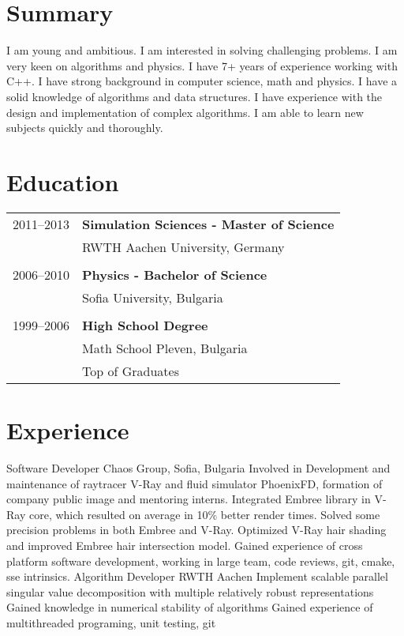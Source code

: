 \section*{Summary} 
I am young and ambitious. I am interested in solving challenging
problems. I am very keen on algorithms and physics. I have 7+ years of
experience working with C++. I have strong background in computer
science, math and physics. I have a solid knowledge of algorithms and
data structures. I have experience with the design and implementation
of complex algorithms. I am able to learn new subjects quickly and
thoroughly.

\section*{Education}
\begin{tabular}{ l l }
2011--2013  & \textbf{Simulation Sciences - Master of Science}\\
            & RWTH Aachen University, Germany\\
& \\
2006--2010  & \textbf{Physics - Bachelor of Science}\\
            & Sofia University, Bulgaria\\ 
& \\
1999--2006  & \textbf{High School Degree}\\    
            & Math School Pleven, Bulgaria\\
            &Top of Graduates\\
\end{tabular}
\section*{Experience}
{Software Developer}
{Chaos Group, Sofia, Bulgaria}
{Involved in Development and maintenance of raytracer V-Ray and fluid simulator PhoenixFD, formation of company public image and mentoring interns.}
{Integrated Embree library in V-Ray core, which resulted on average in 10\% better render times. Solved some precision problems in both Embree and V-Ray. Optimized V-Ray hair shading and improved Embree hair intersection model.}
{Gained experience of cross platform software development, working in large team, code reviews, git, cmake, sse intrinsics.}
{Algorithm Developer}
{RWTH Aachen}
{Implement scalable parallel singular value decomposition with multiple relatively robust representations}
{Gained knowledge in numerical stability of algorithms}
{Gained experience of multithreaded programing, unit testing, git}

